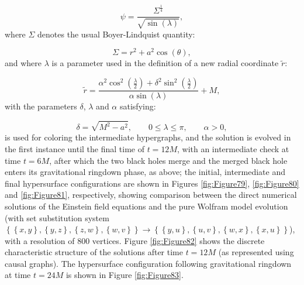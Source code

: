 \documentclass{article}
\begin{document}
\begin{equation}
\psi = \frac{\Sigma^{\frac{1}{4}}}{\sqrt{\sin \left( \lambda \right)}},
\end{equation}
where ${\Sigma}$ denotes the usual Boyer-Lindquist quantity:

\begin{equation}
\Sigma = r^2 + a^2 \cos \left( \theta \right),
\end{equation}
and where ${\lambda}$ is a parameter used in the definition of a new radial coordinate ${\tilde{r}}$:

\begin{equation}
\tilde{r} = \frac{\alpha^2 \cos^2 \left( \frac{\lambda}{2} \right) + \delta^2 \sin^2 \left( \frac{\lambda}{2} \right)}{\alpha \sin \left( \lambda \right)} + M,
\end{equation}
with the parameters ${\delta}$, ${\lambda}$ and ${\alpha}$ satisfying:

\begin{equation}
\delta = \sqrt{M^2 - a^2}, \qquad 0 \leq \lambda \leq \pi, \qquad \alpha > 0,
\end{equation}
is used for coloring the intermediate hypergraphs, and the solution is evolved in the first instance until the final time of ${t = 12 M}$, with an intermediate check at time ${t = 6 M}$, after which the two black holes merge and the merged black hole enters its gravitational ringdown phase, as above; the initial, intermediate and final hypersurface configurations are shown in Figures \ref{fig:Figure79}, \ref{fig:Figure80} and \ref{fig:Figure81}, respectively, showing comparison between the direct numerical solutions of the Einstein field equations and the pure Wolfram model evolution (with set substitution system ${\left\lbrace \left\lbrace x, y \right\rbrace, \left\lbrace y, z \right\rbrace, \left\lbrace z, w \right\rbrace, \left\lbrace w, v \right\rbrace \right\rbrace \to \left\lbrace \left\lbrace y, u \right\rbrace, \left\lbrace u, v \right\rbrace, \left\lbrace w, x \right\rbrace, \left\lbrace x, u \right\rbrace \right\rbrace}$), with a resolution of 800 vertices. Figure \ref{fig:Figure82} shows the discrete characteristic structure of the solutions after time ${t = 12 M}$ (as represented using causal graphs). The hypersurface configuration following gravitational ringdown at time ${t = 24 M}$ is shown in Figure \ref{fig:Figure83}.
\end{document}
